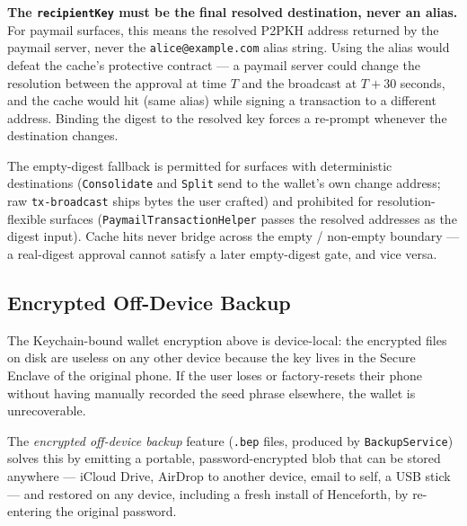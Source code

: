 \documentclass[a4paper, 11pt, openany]{book}
\begin{document}
\begin{notebox}
\textbf{The \texttt{recipientKey} must be the final resolved destination, never an alias.} For paymail surfaces, this means the resolved P2PKH address returned by the paymail server, never the \texttt{alice@example.com} alias string. Using the alias would defeat the cache's protective contract --- a paymail server could change the resolution between the approval at time $T$ and the broadcast at $T+30$ seconds, and the cache would hit (same alias) while signing a transaction to a different address. Binding the digest to the resolved key forces a re-prompt whenever the destination changes.
\end{notebox}

The empty-digest fallback is permitted for surfaces with deterministic destinations (\texttt{Consolidate} and \texttt{Split} send to the wallet's own change address; raw \texttt{tx-broadcast} ships bytes the user crafted) and prohibited for resolution-flexible surfaces (\texttt{Paymail\-Transaction\-Helper} passes the resolved addresses as the digest input). Cache hits never bridge across the empty / non-empty boundary --- a real-digest approval cannot satisfy a later empty-digest gate, and vice versa.

\subsection{Encrypted Off-Device Backup}

The Keychain-bound wallet encryption above is device-local: the encrypted files on disk are useless on any other device because the key lives in the Secure Enclave of the original phone. If the user loses or factory-resets their phone without having manually recorded the seed phrase elsewhere, the wallet is unrecoverable.

The \emph{encrypted off-device backup} feature (\texttt{.bep} files, produced by \texttt{BackupService}) solves this by emitting a portable, password-encrypted blob that can be stored anywhere --- iCloud Drive, AirDrop to another device, email to self, a USB stick --- and restored on any device, including a fresh install of Henceforth, by re-entering the original password.
\end{document}
